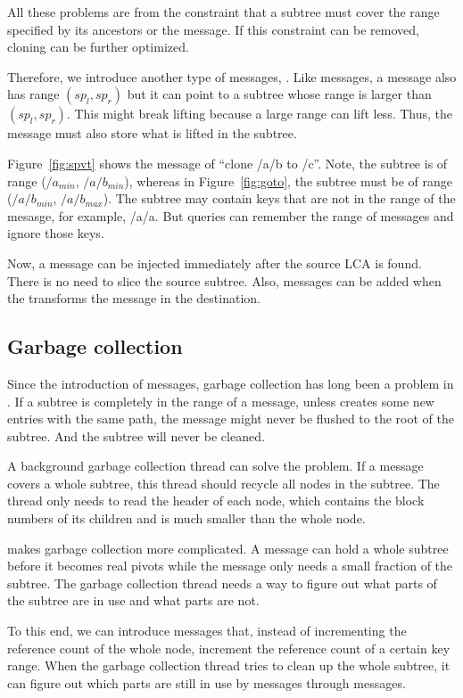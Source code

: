 All these problems are from the constraint that a subtree must cover the range
specified by its ancestors or the \GOTO message.
If this constraint can be removed, cloning can be further optimized.

Therefore, we introduce another type of messages, \spt.
Like \GOTO messages, a \spt message also has range $(sp_l, sp_r)$ but it can
point to a subtree whose range is larger than $(sp_l, sp_r)$.
This might break lifting because a large range can lift less.
Thus, the \spt message must also store what is lifted in the subtree.

Figure~\ref{fig:spvt} shows the \spt message of ``clone /a/b to /c''.
Note, the subtree is of range ($/a_{min}$, $/a/b_{min}$), whereas in
Figure~\ref{fig:goto}, the subtree must be of range
($/a/b_{min}$, $/a/b_{max}$).
The subtree may contain keys that are not in the range of the \spt mesasge,
for example, /a/a.
But queries can remember the range of \spt messages and ignore those keys.

Now, a \spt message can be injected immediately after the source LCA is found.
There is no need to slice the source subtree.
Also, \spt messages can be added when the \bet transforms the \spt message in
the destination.

\subsection{Garbage collection}

Since the introduction of \rd messages, garbage collection has long been
a problem in \betrfs.
If a subtree is completely in the range of a \rd message, unless \betrfs creates
some new entries with the same path, the \rd message might never be flushed
to the root of the subtree.
And the subtree will never be cleaned.

A background garbage collection thread can solve the problem.
If a \rd message covers a whole subtree, this thread should recycle all nodes
in the subtree.
The thread only needs to read the header of each node, which contains the block
numbers of its children and is much smaller than the whole node.

\Spt makes garbage collection more complicated.
A \spt message can hold a whole subtree before it becomes real pivots while
the \spt message only needs a small fraction of the subtree.
The garbage collection thread needs a way to figure out what parts of the
subtree are in use and what parts are not.

To this end, we can introduce \rrefc messages that, instead of incrementing
the reference count of the whole node, increment the reference count of a
certain key range.
When the garbage collection thread tries to clean up the whole subtree, it can
figure out which parts are still in use by \spt messages through
\rrefc messages.

